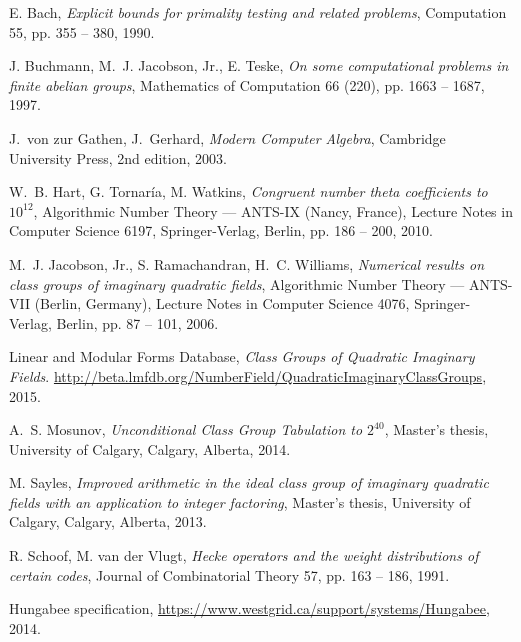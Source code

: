 \documentclass[a4paper,10pt]{article}
\begin{document}
\begin{thebibliography}{Koh05}




\normalsize
\baselineskip=17pt

E. Bach,
\emph{Explicit bounds for primality testing and related problems},
Computation 55, pp. 355 -- 380, 1990.

J. Buchmann, M.~J. Jacobson, Jr., E. Teske,
\emph{On some computational problems in finite abelian groups},
Mathematics of Computation 66 (220), pp. 1663 -- 1687, 1997.

J.\ von zur Gathen, J.\ Gerhard,
\emph{Modern Computer Algebra},
Cambridge University Press, 2nd edition, 2003.

W.~B. Hart, G. Tornar\'ia, M. Watkins,
\emph{Congruent number theta coefficients to $10^{12}$},
Algorithmic Number Theory --- ANTS-IX (Nancy, France), Lecture Notes in Computer Science 6197, Springer-Verlag, Berlin, pp. 186 -- 200,  2010.

M.~J. Jacobson, Jr., S. Ramachandran, H.~C. Williams,
\emph{Numerical results on class groups of imaginary quadratic fields},
Algorithmic Number Theory --- ANTS-VII (Berlin, Germany), Lecture Notes in Computer Science 4076, Springer-Verlag, Berlin, pp. 87 -- 101,  2006.

Linear and Modular Forms Database,
\emph{Class Groups of Quadratic Imaginary Fields}.
\url{http://beta.lmfdb.org/NumberField/QuadraticImaginaryClassGroups},
2015.

A.~S. Mosunov,
\emph{Unconditional Class Group Tabulation to $2^{40}$},
Master's thesis, University of Calgary, Calgary, Alberta, 2014.

M. Sayles,
\emph{Improved arithmetic in the ideal class group of imaginary quadratic fields with an application to integer factoring},
Master's thesis, University of Calgary, Calgary, Alberta, 2013.

R. Schoof, M. van der Vlugt,
\emph{Hecke operators and the weight distributions of certain codes},
Journal of Combinatorial Theory 57, pp. 163 -- 186, 1991.

Hungabee specification,
\url{https://www.westgrid.ca/support/systems/Hungabee}, 2014.

\end{thebibliography}
\end{document}
